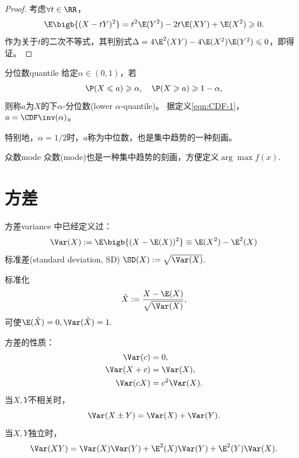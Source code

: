 \begin{proof}
	考虑$\forall t\in\RR$，
	\[
		\E\bigb{(X-tY)^2}=t^2\E(Y^2)-2t\E(XY)+\E(X^2)\geqslant 0.
	\]
	作为关于$t$的二次不等式，其判别式$\Delta=4\E^2(XY)-4\E(X^2)\E(Y^2)\leqslant 0$，即得证。
\end{proof}

\begin{definition}{分位数}{quantile}
	给定$\alpha\in(0,1)$，若
	\[
		\P(X\leqslant a)\geqslant\alpha,\quad\P(X\geqslant a)\geqslant 1-\alpha,
	\]
	则称$a$为$X$的下$\alpha$-分位数(lower $\alpha$-quantile)。
	据定义\eqref{eqn:CDF-1}，$a=\CDF\inv(\alpha)$。

	特别地，$\alpha=1/2$时，$a$称为中位数，也是集中趋势的一种刻画。
\end{definition}

\begin{definition}
	{众数}{mode}
	众数(mode)也是一种集中趋势的刻画，方便定义$\arg\max f(x).$
\end{definition}

\section{方差}

\begin{definition}
	{方差}{variance}
	 中已经定义过：
	\begin{equation}
		\Var(X):=\E\bigb{(X-\E(X))^2}\equiv\E(X^2)-\E^2(X)
	\end{equation}
	标准差(standard deviation, SD) $\SD(X):=\sqrt{\Var(X)}.$
\end{definition}

\begin{corollary}
	标准化
	\begin{equation}
		\check X:=\frac{X-\E(X)}{\sqrt{\Var(X)}},
	\end{equation}
	可使$\E(\check X)=0,\Var(\check X)=1.$
\end{corollary}

\begin{corollary}
	方差的性质：
	\begin{subequations}
		\begin{align}
			\Var(c)&=0,\\
			\Var(X+c)&=\Var(X),\\
			\Var(cX)&=c^2\Var(X).
		\end{align}
	\end{subequations}
	当$X,Y$不相关时，
	\begin{equation}
		\Var(X\pm Y)=\Var(X)+\Var(Y).
	\end{equation}
	当$X,Y$独立时，
	\begin{equation}
		\Var(XY)=\Var(X)\Var(Y)+\E^2(X)\Var(Y)+\E^2(Y)\Var(X).
	\end{equation}
\end{corollary}

